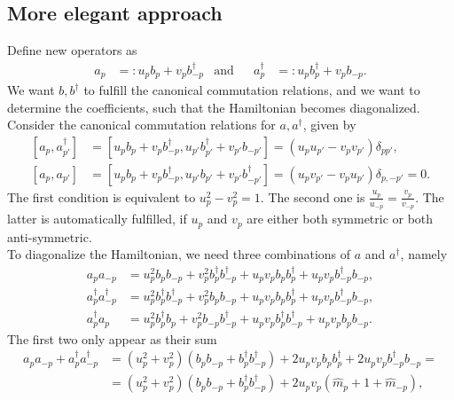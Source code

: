 \documentclass[english, parskip=full]{scrartcl}
\newcommand{\kla}{}
\newcommand{\klam}{}
\newcommand{\tecxt}{}
\begin{document}
\subsection{More elegant approach}
Define new operators as
\begin{align}
a_p&=:u_pb_p+v_pb_{-p}^\dagger&\tecxt\text{and}&&a_p^\dagger&=:u_pb_p^\dagger+v_pb_{-p}.
\end{align}
We want $b,b^\dagger$ to fulfill the canonical commutation relations, and we want to determine the coefficients, such that the Hamiltonian becomes diagonalized.
Consider the canonical commutation relations for $a,a^\dagger$, given by
\begin{align}
\klam\left[ {a_p,a_{p'}^\dagger} \right]&=\klam\left[ {u_pb_p+v_{p}b_{-p}^\dagger,u_{p'}b_{p'}^\dagger + v_{p'}b_{-p'}} \right]=(u_pu_{p'}-v_pv_{p'}) \delta_{pp'},\\
\klam\left[ {a_p,a_{p'}} \right]&=\klam\left[ {u_pb_p+v_{p}b_{-p}^\dagger,u_{p'}b_{p'} + v_{p'}b_{-p'}^\dagger} \right]=(u_pv_{p'}-v_pu_{p'})\delta_{p,-p'}=0.
\end{align}
The first condition is equivalent to $u_p^2-v_p^2=1$. 
The second one is $\frac{u_p}{u_{-p}}=\frac{v_p}{v_{-p}}$.
The latter is automatically fulfilled, if $u_p$ and $v_p$ are either both symmetric or both anti-symmetric.
\\
To diagonalize the Hamiltonian, we need three combinations of $a$ and $a^\dagger$, namely
\begin{align}
a_pa_{-p}&=u_p^2b_pb_{-p}+v_p^2b_p^\dagger b_{-p}^\dagger +u_pv_pb_pb_p^\dagger + u_pv_pb_{-p}^\dagger b_{-p},\\
a_p^\dagger a_{-p}^\dagger&=u_p^2b_p^\dagger b_{-p}^\dagger+v_p^2b_p b_{-p} +u_pv_pb_pb_p^\dagger + u_pv_pb_{-p}^\dagger b_{-p},\\
a_p^\dagger a_p&=u_p^2b_p^\dagger b_p +v_p^2b_{-p}b_{-p}^\dagger +u_pv_pb_p^\dagger b_{-p}^\dagger + u_pv_pb_pb_{-p}.
\end{align}
The first two only appear as their sum
\begin{align}
a_pa_{-p}+a_p^\dagger a_{-p}^\dagger&=(u_p^2+v_p^2)\kla\left( {b_pb_{-p} + b_p^\dagger b_{-p}^\dagger} \right)+ 2u_pv_pb_pb_p^\dagger +2u_pv_pb_{-p}^\dagger b_{-p}=\\
&=(u_p^2+v_p^2)\kla\left( {b_pb_{-p} + b_p^\dagger b_{-p}^\dagger} \right) + 2u_pv_p\kla\left( {\hat{m}_p+1+\hat{m}_{-p}} \right),
\end{align}
\end{document}
